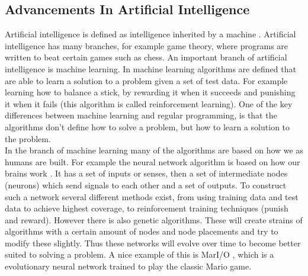 \documentclass[a4paper]{article}
\begin{document}
\subsection{Advancements In Artificial Intelligence}
Artificial intelligence is defined as intelligence inherited by a machine \cite{AIbasic}. Artificial intelligence has many branches, for example game theory, where programs are written to beat certain games such as chess. An important branch of artificial intelligence is machine learning. In machine learning algorithms are defined that are able to learn a solution to a problem given a set of test data. For example learning how to balance a stick, by rewarding it when it succeeds and punishing it when it fails (this algorithm is called reinforcement learning). One of the key differences between machine learning and regular programming, is that the algorithms don't define how to solve a problem, but how to learn a solution to the problem.\\

In the branch of machine learning many of the algorithms are based on how we as humans are built. For example the neural network algorithm is based on how our brains work \cite{Nnetwork}. It has a set of inputs or senses, then a set of intermediate nodes (neurons) which send signals to each other and a set of outputs. To construct such a network several different methods exist, from using training data and test data to achieve highest coverage, to reinforcement training techniques (punish and reward). However there is also genetic algorithms. These will create strains of algorithms with a certain amount of nodes and node placements and try to modify these slightly. Thus these networks will evolve over time to become better suited to solving a problem. A nice example of this is MarI/O \cite{Mario}, which is a evolutionary neural network trained to play the classic Mario game.\\
\end{document}
